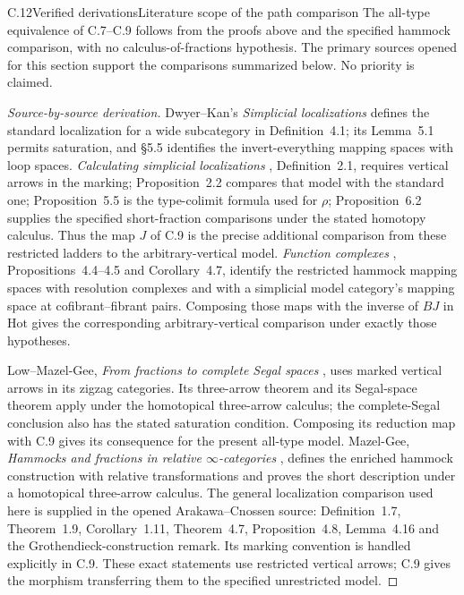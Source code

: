 \begin{claim}{C.12}{Verified derivations}{Literature scope of the path comparison}
The all-type equivalence of C.7--C.9 follows from the proofs above
and the specified hammock comparison, with no calculus-of-fractions
hypothesis. The primary sources opened for this section support the
comparisons summarized below. No priority is claimed.
\end{claim}
\begin{proof}[Source-by-source derivation]
Dwyer--Kan's \emph{Simplicial localizations} \cite{CpathsDKSimplicial} defines the standard
localization for a wide subcategory in Definition~4.1; its
Lemma~5.1 permits saturation, and \S5.5 identifies the
invert-everything mapping spaces with loop spaces.
\emph{Calculating simplicial localizations} \cite{CpathsDKCalculating}, Definition~2.1,
requires vertical arrows in the marking; Proposition~2.2 compares
that model with the standard one; Proposition~5.5 is the type-colimit
formula used for $\rho$; Proposition~6.2 supplies the specified
short-fraction comparisons under the stated homotopy calculus.
Thus the map $J$ of C.9 is the precise additional comparison from
these restricted ladders to the arbitrary-vertical model.
\emph{Function complexes} \cite{CpathsDKFunction}, Propositions~4.4--4.5 and
Corollary~4.7, identify the restricted hammock mapping spaces with
resolution complexes and with a simplicial model category's mapping
space at cofibrant--fibrant pairs. Composing those maps with the
inverse of $BJ$ in $\mathrm{Hot}$ gives the corresponding
arbitrary-vertical comparison under exactly those hypotheses.

Low--Mazel-Gee, \emph{From fractions to complete Segal spaces} \cite{CpathsLowMazelGee},
uses marked vertical arrows in its zigzag categories. Its
three-arrow theorem and its Segal-space theorem apply under the
homotopical three-arrow calculus; the complete-Segal conclusion
also has the stated saturation condition. Composing its reduction
map with C.9 gives its consequence for the present all-type model.
Mazel-Gee, \emph{Hammocks and fractions in relative
$\infty$-categories} \cite{CpathsMazelGee}, defines the enriched hammock construction
with relative transformations and proves the short description
under a homotopical three-arrow calculus. The general localization
comparison used here is supplied in the opened Arakawa--Cnossen
source: Definition~1.7, Theorem~1.9, Corollary~1.11,
Theorem~4.7, Proposition~4.8, Lemma~4.16 and the
Grothendieck-construction remark. Its marking convention is handled
explicitly in C.9. These exact statements use restricted vertical
arrows; C.9 gives the morphism transferring them to the specified
unrestricted model.


\end{proof}
